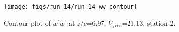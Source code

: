 \begin{figure}[H]
\centering
\texttt{[image: figs/run\_14/run\_14\_ww\_contour]}
\caption{Contour plot of $\overline{w^\prime w^\prime}$ at $z/c$=6.97, $V_{free}$=21.13, station 2.}
\label{fig:run_14_ww_contour}
\end{figure}


